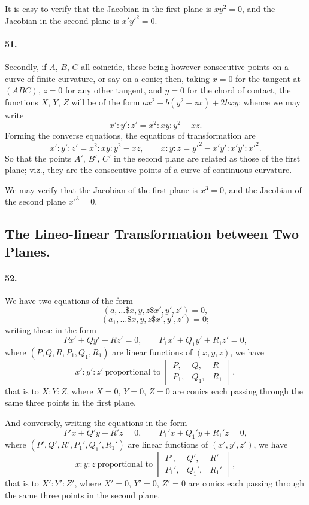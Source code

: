 \documentclass[11pt]{article}
\begin{document}
\medskip

It is easy to verify that the Jacobian in the first plane is $xy^{2}=0$,
and the Jacobian in the second plane is $x'y'^{2}=0$.

\medskip

\paragraph{51.}
Secondly, if $A$, $B$, $C$ all coincide, these being however consecutive
points on a curve of finite curvature, or say on a conic; then, taking
$x=0$ for the tangent at $(ABC)$, $z=0$ for any other tangent, and $y=0$
for the chord of contact, the functions $X$, $Y$, $Z$ will be of the
form $ax^{2}+b(y^{2}-zx)+2hxy$; whence we may write
\[
x':y':z' = x^{2}:xy:y^{2}-xz.
\]
Forming the converse equations, the equations of transformation are
\[
x':y':z' = x^{2}:xy:y^{2}-xz,\qquad x:y:z = y'^{2}-x'y':x'y':x'^{2}.
\]
So that the points $A'$, $B'$, $C'$ in the second plane are related as
those of the first plane; viz., they are the consecutive points of a
curve of continuous curvature.

\medskip

We may verify that the Jacobian of the first plane is $x^{3}=0$, and the
Jacobian of the second plane $x'^{3}=0$.

\bigskip

\subsection*{The Lineo-linear Transformation between Two Planes.}

\paragraph{52.}
We have two equations of the form
\[
(a,\ldots\!\$\!x,y,z\!\$\!x',y',z')=0,
\]
\[
(a_{1},\ldots\!\$\!x,y,z\!\$\!x',y',z')=0;
\]
writing these in the form
\[
Px'+Qy'+Rz'=0,\qquad P_{1}x'+Q_{1}y'+R_{1}z'=0,
\]
where $(P,Q,R,P_{1},Q_{1},R_{1})$ are linear functions of $(x,y,z)$, we
have
\[
x':y':z'\ \text{proportional to}\ \begin{vmatrix}P,&Q,&R\\
P_{1},&Q_{1},&R_{1}\end{vmatrix},
\]
that is to $X:Y:Z$, where $X=0$, $Y=0$, $Z=0$ are conics each passing
through the same three points in the first plane.

\medskip

And conversely, writing the equations in the form
\[
P'x+Q'y+R'z=0,\qquad P_{1}'x+Q_{1}'y+R_{1}'z=0,
\]
where $(P',Q',R',P_{1}',Q_{1}',R_{1}')$ are linear functions of
$(x',y',z')$, we have
\[
x:y:z\ \text{proportional to}\ \begin{vmatrix}P',&Q',&R'\\
P_{1}',&Q_{1}',&R_{1}'\end{vmatrix},
\]
that is to $X':Y':Z'$, where $X'=0$, $Y'=0$, $Z'=0$ are conics each
passing through the same three points in the second plane.
\end{document}
